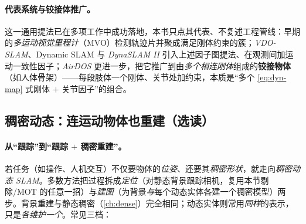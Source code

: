 \paragraph{代表系统与铰接体推广。}
这一通用提法已在多项工作中成功落地，本书只点其代表、不复述工程管线\cite{schmid2026dynamic}：早期的\emph{多运动视觉里程计}（MVO）检测轨迹片并聚成满足刚体约束的簇；\emph{VDO-SLAM}、Dynamic SLAM 与 \emph{DynaSLAM II}\cite{bescos2018dynaslam} 引入上述因子图提法、在观测间加运动一致性因子；\emph{AirDOS} 更进一步，把它推广到由\emph{多个相连刚体}组成的\textbf{铰接物体}（如人体骨架）——每段肢体一个刚体、关节处加约束，本质是“多个 \cref{eq:dyn-map} 式刚体 $+$ 关节因子”的组合。

\subsection{稠密动态：连运动物体也重建（选读）}
\label{sec:dynamic-dense}

\paragraph{从“跟踪”到“跟踪 $+$ 稠密重建”。}
若任务（如操作、人机交互）不仅要物体的\emph{位姿}、还要其\emph{稠密形状}，就走向\emph{稠密动态 SLAM}\cite{schmid2026dynamic}。多数方法把过程拆成\emph{定位}（对静态背景跟踪相机，复用本节剔除/MOT 的任意一招）与\emph{建图}（为背景\emph{与}每个动态实体各建一个稠密模型）两步。背景重建与静态稠密（\cref{ch:dense}）完全相同；动态实体则常用\emph{同样}的表示，只是\emph{各维护一个}。常见三档：

